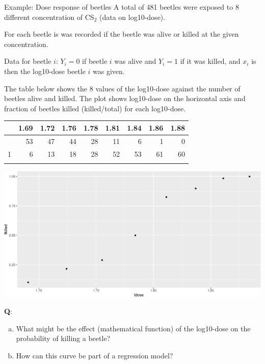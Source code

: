 \documentclass[
  ignorenonframetext,
]{beamer}
\providecommand{\tightlist}{%
  \setlength{\itemsep}{0pt}\setlength{\parskip}{0pt}}
\begin{document}
\begin{frame}
\begin{block}{Example: Dose response of beetles}
\label{example-dose-response-of-beetles}
A total of 481 beetles were exposed to 8 different concentration of
CS\(_2\) (data on log10-dose).

For each beetle is was recorded if the beetle was alive or killed at the
given concentration.

Data for beetle \(i\): \(Y_i=0\) if beetle \(i\) was alive and \(Y_i=1\)
if it was killed, and \(x_i\) is then the log10-dose beetle \(i\) was
given.
\end{block}
\end{frame}

\begin{frame}
The table below shows the 8 values of the log10-dose against the number
of beetles alive and killed. The plot shows log10-dose on the horizontal
axis and fraction of beetles killed (killed/total) for each log10-dose.

\begin{longtable}[]{@{}lrrrrrrrr@{}}
\toprule\noalign{}
& 1.69 & 1.72 & 1.76 & 1.78 & 1.81 & 1.84 & 1.86 & 1.88 \\
\midrule\noalign{}
\endhead
0 & 53 & 47 & 44 & 28 & 11 & 6 & 1 & 0 \\
1 & 6 & 13 & 18 & 28 & 52 & 53 & 61 & 60 \\
\bottomrule\noalign{}
\end{longtable}
\end{frame}

\begin{frame}
\includegraphics{Module03PresentationWeek1_files/figure-beamer/unnamed-chunk-2-1.pdf}
\end{frame}

\begin{frame}
\textbf{Q}:

\begin{enumerate}
[a.]
\tightlist
\item
  What might be the effect (mathematical function) of the log10-dose on
  the probability of killing a beetle?
\item
  How can this curve be part of a regression model?
\end{enumerate}
\end{frame}
\end{document}
